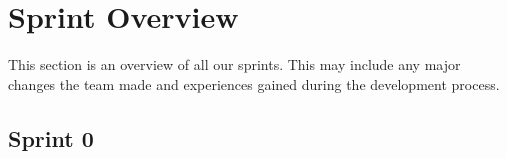 \section{Sprint Overview}
This section is an overview of all our sprints. This may include any major changes the team made and experiences gained during the development process. 

\subsection{Sprint 0}







